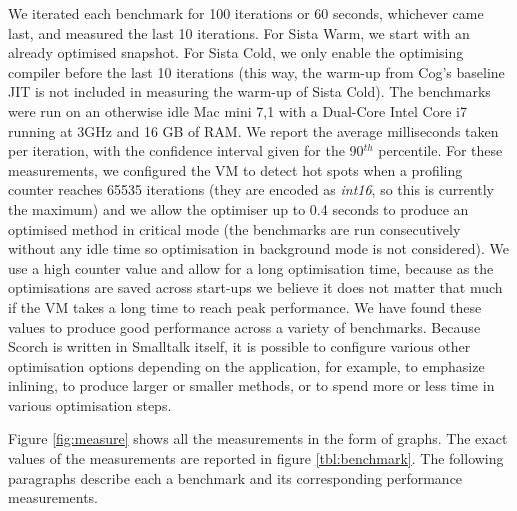 \documentclass[a4paper,12pt,twoside]{../includes/ThesisStyle}
\begin{document}
We iterated each benchmark for 100 iterations or 60 seconds, whichever came last, and measured the last 10 iterations. For Sista Warm, we start with an already optimised snapshot. For Sista Cold, we only enable the optimising compiler before the last 10 iterations (this way, the warm-up from Cog's baseline JIT is not included in measuring the warm-up of Sista Cold). The benchmarks were run on an otherwise idle Mac mini 7,1 with a Dual-Core Intel Core i7 running at 3GHz and 16 GB of RAM. We report the average milliseconds taken per iteration, with the confidence interval given for the 90$^{th}$ percentile. For these measurements, we configured the VM to detect hot spots when a profiling counter reaches 65535 iterations (they are encoded as \emph{int16}, so this is currently the maximum) and we allow the optimiser up to 0.4 seconds to produce an optimised method in critical mode (the benchmarks are run consecutively without any idle time so optimisation in background mode is not considered). We use a high counter value and allow for a long optimisation time, because as the optimisations are saved across start-ups we believe it does not matter that much if the VM takes a long time to reach peak performance. We have found these values to produce good performance across a variety of benchmarks. Because Scorch is written in Smalltalk itself, it is possible to configure various other optimisation options depending on the application, for example, to emphasize inlining, to produce larger or smaller methods, or to spend more or less time in various optimisation steps. 

Figure \ref{fig:measure} shows all the measurements in the form of graphs. The exact values of the measurements are reported in figure \ref{tbl:benchmark}. The following paragraphs describe each a benchmark and its corresponding performance measurements. 
\end{document}
